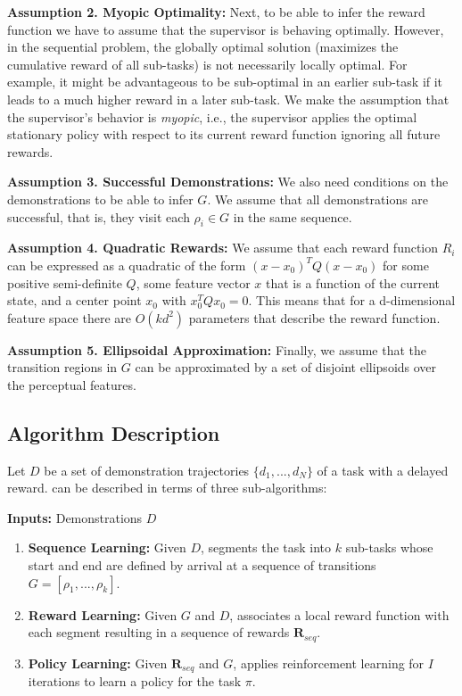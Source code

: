 \vspace{0.5em}\noindent\textbf{Assumption 2. Myopic Optimality: } Next, to be able to infer the reward function we have to assume that the supervisor is behaving optimally. However, in the sequential problem, the globally optimal solution (maximizes the cumulative reward of all sub-tasks) is not necessarily locally optimal. For example, it might be advantageous to be sub-optimal in an earlier sub-task if it leads to a much higher reward in a later sub-task. We make the assumption that the supervisor's behavior is \emph{myopic}, i.e., the supervisor applies the optimal stationary policy with respect to its current reward function ignoring all future rewards. 

\vspace{0.5em}\noindent\textbf{Assumption 3. Successful Demonstrations: } We also need conditions on the demonstrations to be able to infer $G$. We assume that all demonstrations are successful, that is, they visit each $\rho_i \in G$ in the same sequence.

\vspace{0.5em}\noindent\textbf{Assumption 4. Quadratic Rewards: } We assume that each reward function $R_i$ can be expressed as a quadratic of the form $(x-x_0)^T Q (x - x_0)$ for some positive semi-definite $Q$, some feature vector $x$ that is a function of the current state, and a center point $x_0$ with $x_0^T Q x_0 = 0$. This means that for a d-dimensional feature space there are $O(kd^2)$ parameters that describe the reward function.

\vspace{0.5em}\noindent\textbf{Assumption 5. Ellipsoidal Approximation: } Finally, we assume that the transition regions in $G$ can be approximated by a set of disjoint ellipsoids over the perceptual features.


\subsection{Algorithm Description}
Let $D$ be a set of demonstration trajectories $\{d_1,...,d_N\}$ of a task with a delayed reward.
\hirl can be described in terms of three sub-algorithms:

\vspace{2pt}
\noindent\textbf{Inputs:} Demonstrations $D$
\begin{enumerate}[
    topsep=0pt,
    noitemsep,
    leftmargin=*,
    ]
    \item \textbf{Sequence Learning: } Given $D$, \hirl segments the task into $k$ sub-tasks whose start and end are defined by arrival at a sequence of transitions $G = [\rho_1,...,\rho_k]$.
    \item \textbf{Reward Learning: } Given $G$ and $D$, \hirl associates a local reward function with each segment resulting in a sequence of rewards $\mathbf{R}_{seq}$. 
    \item \textbf{Policy Learning: } Given $\mathbf{R}_{seq}$ and $G$, \hirl applies reinforcement learning for $I$ iterations to learn a policy for the task $\pi$. 
\end{enumerate}

